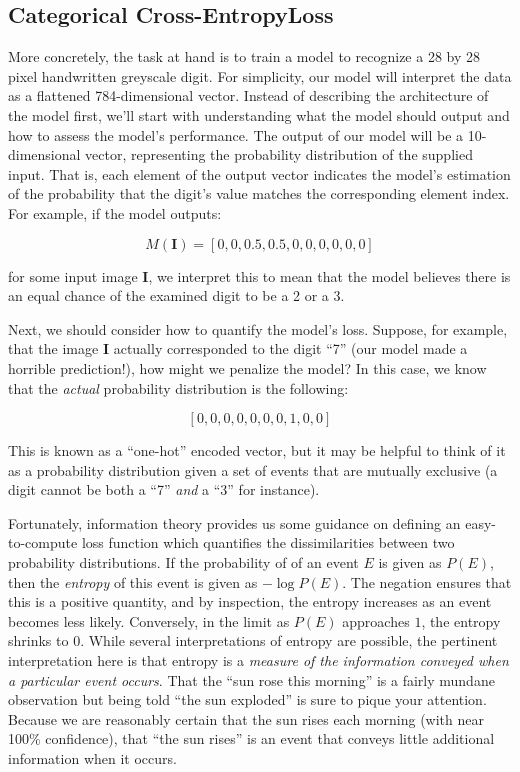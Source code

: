 \subsection{Categorical Cross-EntropyLoss}\label{categorical-cross-entropy-loss}

More concretely, the task at hand is to train a model to recognize a 28
by 28 pixel handwritten greyscale digit. For simplicity, our model will
interpret the data as a flattened 784-dimensional vector. Instead of
describing the architecture of the model first, we'll start with
understanding what the model should output and how to assess the model's
performance. The output of our model will be a 10-dimensional vector,
representing the probability distribution of the supplied input. That
is, each element of the output vector indicates the model's estimation
of the probability that the digit's value matches the corresponding
element index. For example, if the model outputs:

\[M(\mathbf{I}) = \left[0, 0, 0.5, 0.5, 0, 0, 0, 0, 0, 0\right]\]

for some input image \(\mathbf{I}\), we interpret this to mean that the
model believes there is an equal chance of the examined digit to be a 2
or a 3.

Next, we should consider how to quantify the model's loss. Suppose, for
example, that the image \(\mathbf{I}\) actually corresponded to the
digit ``7'' (our model made a horrible prediction!), how might we
penalize the model? In this case, we know that the \emph{actual}
probability distribution is the following:

\[\left[0, 0, 0, 0, 0, 0, 0, 1, 0, 0\right]\]

This is known as a ``one-hot'' encoded vector, but it may be helpful to
think of it as a probability distribution given a set of events that are
mutually exclusive (a digit cannot be both a ``7'' \emph{and} a ``3''
for instance).

Fortunately, information theory provides us some guidance on defining an
easy-to-compute loss function which quantifies the dissimilarities
between two probability distributions. If the probability of of an event
\(E\) is given as \(P(E)\), then the \emph{entropy} of this event is
given as \(-\log P(E)\). The negation ensures that this is a positive
quantity, and by inspection, the entropy increases as an event becomes
less likely. Conversely, in the limit as \(P(E)\) approaches \(1\), the
entropy shrinks to \(0\). While several interpretations of entropy are
possible, the pertinent interpretation here is that entropy is a
\emph{measure of the information conveyed when a particular event
	occurs}. That the ``sun rose this morning'' is a fairly mundane
observation but being told ``the sun exploded'' is sure to pique your
attention. Because we are reasonably certain that the sun rises each
morning (with near 100\% confidence), that ``the sun rises'' is an event
that conveys little additional information when it occurs.

